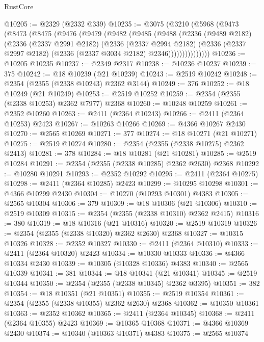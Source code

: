 \begin{lexlean}{RustCore}
\begin{coremodule}
@10205 := @2329 (@2332 @339)
@10235 := @3075
    (@3210
      (@5968
        (@9473
          (@8473
            (@8475
              (@9476
                (@9479
                  (@9482
                    (@9485
                      (@9488
                        (@2336
                          (@9489 @2182)
                          (@2336
                            (@2337 @2991 @2182)
                            (@2336
                              (@2337 @2994 @2182)
                              (@2336
                                (@2337 @2997 @2182)
                                (@2336 (@2337 @3034 @2182) @2346)))))))))))))))
@10236 := @10205 @10235
@10237 := @2349 @2317
@10238 := @10236 @10237
@10239 := 375
@10242 := @18 @10239 (@21 @10239)
@10243 := @2519 @10242
@10248 := @2354 (@2355 (@2338 @10243) @2362 @3144)
@10249 := 376
@10252 := @18 @10249 (@21 @10249)
@10253 := @2519 @10252
@10259 := @2354 (@2355 (@2338 @10253) @2362 @7977) @2368
@10260 := @10248 @10259
@10261 := @2352 @10260
@10263 := @2411 (@2364 @10243)
@10266 := @2411 (@2364 @10253) @2423
@10267 := @10263 @10266
@10269 := @4366 @10267 @2430
@10270 := @2565 @10269
@10271 := 377
@10274 := @18 @10271 (@21 @10271)
@10275 := @2519 @10274
@10280 := @2354 (@2355 (@2338 @10275) @2362 @2413)
@10281 := 378
@10284 := @18 @10281 (@21 @10281)
@10285 := @2519 @10284
@10291 := @2354 (@2355 (@2338 @10285) @2362 @2630) @2368
@10292 := @10280 @10291
@10293 := @2352 @10292
@10295 := @2411 (@2364 @10275)
@10298 := @2411 (@2364 @10285) @2423
@10299 := @10295 @10298
@10301 := @4366 @10299 @2430
@10304 := @10270 (@10293 @10301) @4383
@10305 := @2565 @10304
@10306 := 379
@10309 := @18 @10306 (@21 @10306)
@10310 := @2519 @10309
@10315 := @2354 (@2355 (@2338 @10310) @2362 @2415)
@10316 := 380
@10319 := @18 @10316 (@21 @10316)
@10320 := @2519 @10319
@10326 := @2354 (@2355 (@2338 @10320) @2362 @2630) @2368
@10327 := @10315 @10326
@10328 := @2352 @10327
@10330 := @2411 (@2364 @10310)
@10333 := @2411 (@2364 @10320) @2423
@10334 := @10330 @10333
@10336 := @4366 @10334 @2430
@10339 := @10305 (@10328 @10336) @4383
@10340 := @2565 @10339
@10341 := 381
@10344 := @18 @10341 (@21 @10341)
@10345 := @2519 @10344
@10350 := @2354 (@2355 (@2338 @10345) @2362 @3395)
@10351 := 382
@10354 := @18 @10351 (@21 @10351)
@10355 := @2519 @10354
@10361 := @2354 (@2355 (@2338 @10355) @2362 @2630) @2368
@10362 := @10350 @10361
@10363 := @2352 @10362
@10365 := @2411 (@2364 @10345)
@10368 := @2411 (@2364 @10355) @2423
@10369 := @10365 @10368
@10371 := @4366 @10369 @2430
@10374 := @10340 (@10363 @10371) @4383
@10375 := @2565 @10374

\end{coremodule}
\end{lexlean}
